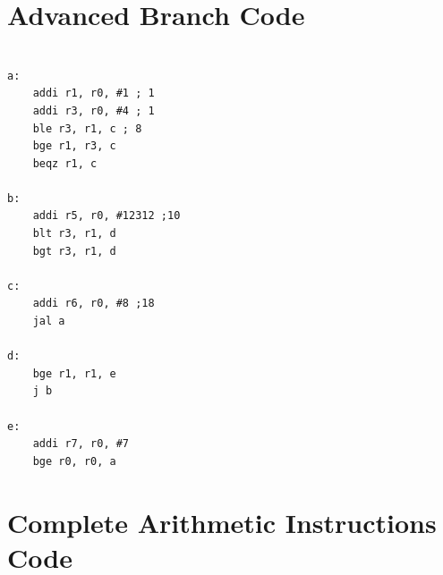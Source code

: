 \section{Advanced Branch Code}

\begin{lstlisting}[style=mips,caption={Advanced Branch Code DLX Assembly example},label=asm_Advanced_Branch_Code]

a:
    addi r1, r0, #1 ; 1
    addi r3, r0, #4 ; 1
    ble r3, r1, c ; 8
    bge r1, r3, c
    beqz r1, c

b:
    addi r5, r0, #12312 ;10
    blt r3, r1, d
    bgt r3, r1, d

c:
    addi r6, r0, #8 ;18
    jal a

d:
    bge r1, r1, e
    j b

e:
    addi r7, r0, #7
    bge r0, r0, a

\end{lstlisting}


\section{Complete Arithmetic Instructions Code}

